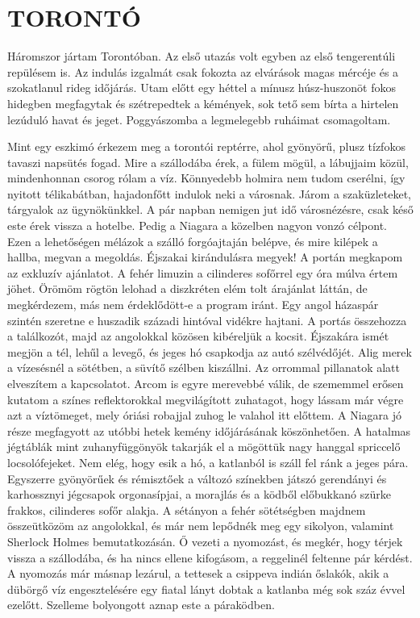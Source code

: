 \clearpage
\chapter{TORONTÓ}

Háromszor jártam Torontóban. Az első utazás volt egyben az első
tengerentúli repülésem is. Az indulás izgalmát csak fokozta az elvárások
magas mércéje és a szokatlanul rideg időjárás. Utam előtt egy
héttel a mínusz húsz-huszonöt fokos hidegben megfagytak és szétrepedtek
a kémények, sok tető sem bírta a hirtelen lezúduló havat és
jeget. Poggyászomba a legmelegebb ruháimat csomagoltam.

Mint egy eszkimó érkezem meg a torontói reptérre, ahol gyönyörű,
plusz tízfokos tavaszi napsütés fogad. Mire a szállodába érek, a fülem
mögül, a lábujjaim közül, mindenhonnan csorog rólam a víz. Könnyedebb
holmira nem tudom cserélni, így nyitott télikabátban, hajadonfőtt
indulok neki a városnak. Járom a szaküzleteket, tárgyalok az
ügynökünkkel. A pár napban nemigen jut idő városnézésre, csak késő
este érek vissza a hotelbe. Pedig a Niagara a közelben nagyon vonzó
célpont. Ezen a lehetőségen mélázok a szálló forgóajtaján belépve,
és mire kilépek a hallba, megvan a megoldás. Éjszakai kirándulásra
megyek! A portán megkapom az exkluzív ajánlatot. A fehér limuzin
a cilinderes sofőrrel egy óra múlva értem jöhet. Örömöm rögtön lelohad
a diszkréten elém tolt árajánlat láttán, de megkérdezem, más nem
érdeklődött-e a program iránt. Egy angol házaspár szintén szeretne e
huszadik századi hintóval vidékre hajtani. A portás összehozza a
találkozót, majd az angolokkal közösen kibéreljük a kocsit. Éjszakára
ismét megjön a tél, lehűl a levegő, és jeges hó csapkodja az autó
szélvédőjét. Alig merek a vízesésnél a sötétben, a süvítő szélben kiszállni.
Az orrommal pillanatok alatt elveszítem a kapcsolatot. Arcom is egyre
merevebbé válik, de szememmel erősen kutatom a színes reflektorokkal
megvilágított zuhatagot, hogy lássam már végre azt a víztömeget,
mely óriási robajjal zuhog le valahol itt előttem. A Niagara jó része
megfagyott az utóbbi hetek kemény időjárásának köszönhetően. A hatalmas
jégtáblák mint zuhanyfüggönyök takarják el a mögöttük nagy
hanggal spriccelő locsolófejeket. Nem elég, hogy esik a hó, a katlanból
is száll fel ránk a jeges pára. Egyszerre gyönyörűek és rémisztőek a
változó színekben játszó gerendányi és karhossznyi jégcsapok orgonasípjai,
a morajlás és a ködből előbukkanó szürke frakkos, cilinderes
sofőr alakja. A sétányon a fehér sötétségben majdnem összeütközöm
az angolokkal, és már nem lepődnék meg egy sikolyon, valamint Sherlock
Holmes bemutatkozásán. Ő vezeti a nyomozást, és megkér, hogy
térjek vissza a szállodába, és ha nincs ellene kifogásom, a reggelinél
feltenne pár kérdést. A nyomozás már másnap lezárul, a tettesek a
csippeva indián őslakók, akik a dübörgő víz engesztelésére egy fiatal
lányt dobtak a katlanba még sok száz évvel ezelőtt. Szelleme bolyongott
aznap este a páraködben.

